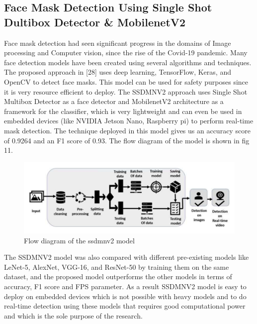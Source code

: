 \documentclass[12pt,a4paper]{article}
\begin{document}
\subsection{Face Mask Detection Using Single Shot Dultibox Detector \& MobilenetV2}
Face mask detection had seen significant progress in the domains of Image processing and Computer vision, since the rise of the Covid-19 pandemic. Many face detection models have been created using several algorithms and techniques. The proposed approach in [28] uses deep learning, TensorFlow, Keras, and OpenCV to detect face masks. This model can be used for safety purposes since it is very resource efficient to deploy. The SSDMNV2 approach uses Single Shot Multibox Detector as a face detector and MobilenetV2 architecture as a framework for the classifier, which is very lightweight and can even be used in embedded devices (like NVIDIA Jetson Nano, Raspberry pi) to perform real-time mask detection. The technique deployed in this model gives us an accuracy score of 0.9264 and an F1 score of 0.93. The flow diagram of the model is shown in fig 11.
\begin{figure}[h]
\centerline{\includegraphics[scale=.6]{ssdmnv2.png}}
\caption{Flow diagram of the ssdmnv2 model}
\label{fig 11}
\end{figure}
The SSDMNV2 model was also compared with different pre-existing models like LeNet-5, AlexNet, VGG-16, and ResNet-50 by training them on the same dataset, and the proposed model outperforms the other models in terms of accuracy, F1 score and FPS parameter. As a result SSDMNV2 model is easy to deploy on embedded devices which is not possible with heavy models and to do real-time detection using these models that requires good computational power and which is the sole purpose of the research.
\end{document}
